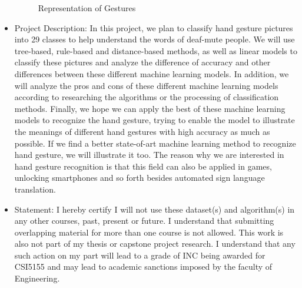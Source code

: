 \documentclass{article}
\begin{document}
\begin{itemize}
\begin{figure}[h!]
        \caption{Representation of Gestures}
        \label{fig:hands}
        \end{figure}
\item Project Description: In this project, we plan to classify hand gesture pictures into 29 classes to help understand the words of deaf-mute people. We will use tree-based, rule-based and distance-based methods, as well as linear models to classify these pictures and analyze the difference of accuracy and other differences between these different machine learning models. In addition, we will analyze the pros and cons of these different machine learning models according to researching the algorithms or the processing of classification methods. Finally, we hope we can apply the best of these machine learning models to recognize the hand gesture, trying to enable the model to illustrate the meanings of different hand gestures with high accuracy as much as possible. If we find a better state-of-art machine learning method to recognize hand gesture, we will illustrate it too. The reason why we are interested in hand gesture recognition is that this field can also be applied in games, unlocking smartphones and so forth besides automated sign language translation.
\item Statement: I hereby certify I will not use
these dataset(s) and algorithm(s) in any other courses, past, present or future. I understand that submitting overlapping material for more than one course is not allowed. This work is also not part of my thesis or capstone project research. I understand that any such action on my part will lead to a grade of INC being awarded for CSI5155 and may lead to academic sanctions imposed by the faculty of Engineering.
\end{itemize}
\end{document}
